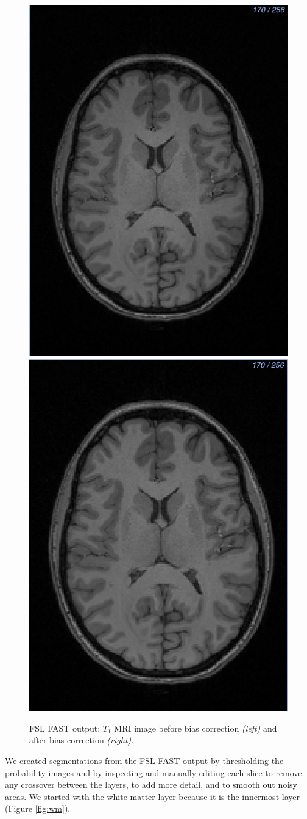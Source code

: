 \begin{figure}[H]
\begin{center}
\includegraphics[width=.45\textwidth]{Figures/Original_T1}
\includegraphics[width=.45\textwidth]{Figures/T1_corrected}
\caption{FSL FAST output: $T_1$ MRI image before bias correction \textit{(left)} and after bias correction \textit{(right)}.}
\label{fig:fastoutbias}
\end{center}
\end{figure}


We created segmentations from the FSL FAST output by thresholding the probability images and by inspecting and manually editing each slice to remove any crossover between the layers, to add more detail, and to smooth out noisy areas. We started with the white matter layer because it is the innermost layer (Figure \ref{fig:wm}).

